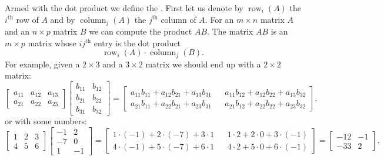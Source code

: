 \documentclass{ximera}
\begin{document}
Armed with the dot product we define the \emph{}. First let us denote by $\operatorname{row}_i(A)$ the $i^{\text{th}}$ row of $A$ and by $\operatorname{column}_j(A)$ the $j^{\text{th}}$ column of $A$. For an $m \times n$ matrix $A$ and an $n \times p$ matrix $B$ we can compute the product $AB$.  The matrix $AB$ is an $m \times p$ matrix whose $ij^{\text{th}}$ entry is the dot product
\begin{equation*}
    \operatorname{row}_i(A) \cdot \operatorname{column}_j(B) .
\end{equation*}
For example, given a $2 \times 3$ and a $3 \times 2$ matrix we should end up with a $2 \times 2$ matrix:
\begin{equation} \label{linalg:eqmatrixmulex}
    \begin{bmatrix}
        a_{11} & a_{12} & a_{13} \\
        a_{21} & a_{22} & a_{23}
    \end{bmatrix}
    \begin{bmatrix}
        b_{11} & b_{12} \\
        b_{21} & b_{22} \\
        b_{31} & b_{32}
    \end{bmatrix}
    =
    \begin{bmatrix}
        a_{11} b_{11} +  a_{12} b_{21} +  a_{13} b_{31} & & a_{11} b_{12} +  a_{12} b_{22} +  a_{13} b_{32} \\
        a_{21} b_{11} +  a_{22} b_{21} +  a_{23} b_{31} & & a_{21} b_{12} +  a_{22} b_{22} +  a_{23} b_{32}
    \end{bmatrix} ,
\end{equation}
or with some numbers:
\begin{equation*}
    \begin{bmatrix}
        1 & 2 & 3 \\
        4 & 5 & 6
    \end{bmatrix}
    \begin{bmatrix}
        -1 & 2 \\
        -7 & 0 \\
        1 & -1
    \end{bmatrix}
    =
    \begin{bmatrix}
        1\cdot (-1) + 2\cdot (-7) + 3 \cdot 1 &  & 1\cdot 2 + 2\cdot 0 + 3 \cdot (-1) \\
        4\cdot (-1) + 5\cdot (-7) + 6 \cdot 1 &  & 4\cdot 2 + 5\cdot 0 + 6 \cdot (-1)
    \end{bmatrix}
    =
    \begin{bmatrix}
        -12 & -1 \\
        -33 & 2
    \end{bmatrix} .
\end{equation*}
\end{document}
